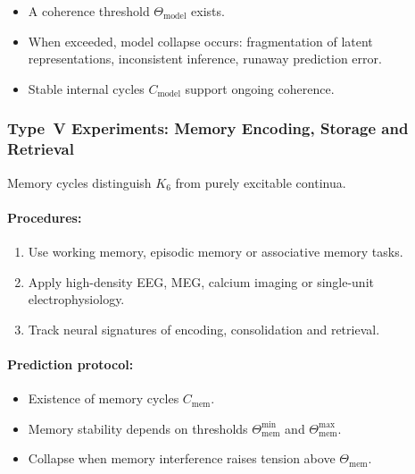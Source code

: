 \begin{itemize}
    \item A coherence threshold $\Theta_{\mathrm{model}}$ exists.
    \item When exceeded, model collapse occurs:
          fragmentation of latent representations,
          inconsistent inference,
          runaway prediction error.
    \item Stable internal cycles $C_{\mathrm{model}}$ support
          ongoing coherence.
\end{itemize}



\subsubsection{Type~V Experiments: Memory Encoding, Storage and Retrieval}

Memory cycles distinguish $K_6$ from purely excitable continua.

\paragraph{Procedures:}

\begin{enumerate}
    \item Use working memory, episodic memory or associative memory tasks.
    \item Apply high-density EEG, MEG, calcium imaging or single-unit
          electrophysiology.
    \item Track neural signatures of encoding, consolidation and retrieval.
\end{enumerate}

\paragraph{Prediction protocol:}

\begin{itemize}
    \item Existence of memory cycles $C_{\mathrm{mem}}$.
    \item Memory stability depends on thresholds
          $\Theta_{\mathrm{mem}}^{\min}$ and
          $\Theta_{\mathrm{mem}}^{\max}$.
    \item Collapse when memory interference raises tension
          above $\Theta_{\mathrm{mem}}$.
\end{itemize}



